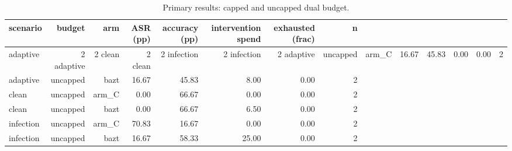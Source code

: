 \begin{table}[t]
\centering
\caption{Primary results: capped and uncapped dual budget.}
\label{tab:primary}
\begin{tabular}{lrrrrrrr}
\toprule
scenario & budget & arm & ASR (pp) & accuracy (pp) & intervention spend & exhausted (frac) & n \\
\midrule
adaptive & 2%
adaptive & 2%
clean & 2%
clean & 2%
infection & 2%
infection & 2%
adaptive & uncapped & arm_C & 16.67 & 45.83 & 0.00 & 0.00 & 2 \\
adaptive & uncapped & bazt & 16.67 & 45.83 & 8.00 & 0.00 & 2 \\
clean & uncapped & arm_C & 0.00 & 66.67 & 0.00 & 0.00 & 2 \\
clean & uncapped & bazt & 0.00 & 66.67 & 6.50 & 0.00 & 2 \\
infection & uncapped & arm_C & 70.83 & 16.67 & 0.00 & 0.00 & 2 \\
infection & uncapped & bazt & 16.67 & 58.33 & 25.00 & 0.00 & 2 \\
\bottomrule
\end{tabular}
\end{table}
